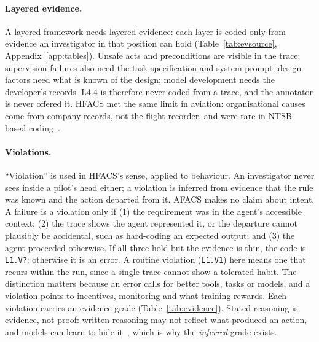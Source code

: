 \documentclass[10pt,a4paper]{article}
\newcommand{\code}[1]{\texttt{#1}}
\begin{document}
\paragraph{Layered evidence.}
\label{sec:evidence}
A layered framework needs layered evidence: each layer is coded only from evidence
an investigator in that position can hold (Table~\ref{tab:evsource},
Appendix~\ref{app:tables}). Unsafe acts and preconditions are visible in the trace;
supervision failures also need the task specification and system prompt; design
factors need what is known of the design; model development needs the developer's
records. L4.4 is therefore never coded from a trace, and the annotator is never
offered it. HFACS met the same limit in aviation: organisational causes come from
company records, not the flight recorder, and were rare in NTSB-based
coding~\cite{wiegmann2001commercial}.

\paragraph{Violations.}
\label{sec:violations}
``Violation'' is used in HFACS's sense, applied to behaviour. An investigator
never sees inside a pilot's head either; a violation is inferred from evidence
that the rule was known and the action departed from it. AFACS makes no claim
about intent. A failure is a violation only if (1) the requirement was in the
agent's accessible context; (2) the trace shows the agent represented it, or the
departure cannot plausibly be accidental, such as hard-coding an expected output;
and (3) the agent proceeded otherwise. If all three hold but the evidence is thin,
the code is \code{L1.V?}; otherwise it is an error. A routine violation
(\code{L1.V1}) here means one that recurs within the run, since a single trace
cannot show a tolerated habit. The distinction matters because an error calls for
better tools, tasks or models, and a violation points to incentives, monitoring
and what training rewards. Each violation carries an evidence grade
(Table~\ref{tab:evidence}). Stated reasoning is evidence, not proof: written
reasoning may not reflect what produced an action, and models can learn to hide
it~\cite{baker2025monitoring}, which is why the \emph{inferred} grade exists.
\end{document}
